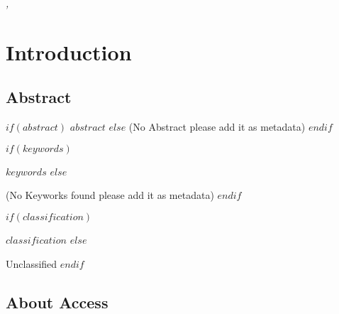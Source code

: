 \documentclass[11pt,fleqn]{book} %
\begin{document}
\noindent \textit{\MONTH, \the\year} %



\pagestyle{empty} %

\tableofcontents %

\cleardoublepage %

\pagestyle{fancy} %



\chapter{Introduction}

\section{Abstract}

$if(abstract)$
\textit{$abstract$}
$else$
(No Abstract please add it as metadata)
$endif$

\vspace{5mm} %


\begin{description}
$if(keywords)$
\item[Keywords] $keywords$
$else$
\item[Keywords] (No Keyworks found please add it as metadata)
$endif$

$if(classification)$
\item[Classification] $classification$
$else$
\item[Classification] Unclassified 
$endif$

\end{description}


\section{About Access}
\end{document}
